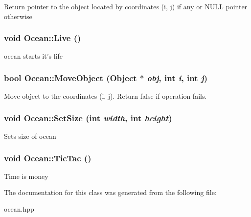 \label{classOcean_abe1c2639f431f057509ba765682fb8cc}
Return pointer to the object located by coordinates (i, j) if any or NULL pointer otherwise \hypertarget{classOcean_ac4ebb157e229dd87113c376366f99888}{
\subsubsection[{Live}]{\setlength{\rightskip}{0pt plus 5cm}void Ocean::Live ()}}
\label{classOcean_ac4ebb157e229dd87113c376366f99888}
ocean starts it's life \hypertarget{classOcean_a7b9cb70ece3c3275003ea49bdba2c2e2}{
\subsubsection[{MoveObject}]{\setlength{\rightskip}{0pt plus 5cm}bool Ocean::MoveObject ({\bf Object} $\ast$ {\em obj}, \/  int {\em i}, \/  int {\em j})}}
\label{classOcean_a7b9cb70ece3c3275003ea49bdba2c2e2}
Move object to the coordinates (i, j). Return false if operation fails. \hypertarget{classOcean_af99ba918325e6190c0185d01d53d4efb}{
\subsubsection[{SetSize}]{\setlength{\rightskip}{0pt plus 5cm}void Ocean::SetSize (int {\em width}, \/  int {\em height})}}
\label{classOcean_af99ba918325e6190c0185d01d53d4efb}
Sets size of ocean \hypertarget{classOcean_a407104f71338029cd64258afc107187a}{
\subsubsection[{TicTac}]{\setlength{\rightskip}{0pt plus 5cm}void Ocean::TicTac ()}}
\label{classOcean_a407104f71338029cd64258afc107187a}
Time is money 

The documentation for this class was generated from the following file:\begin{DoxyCompactItemize}
\item 
ocean.hpp\end{DoxyCompactItemize}
